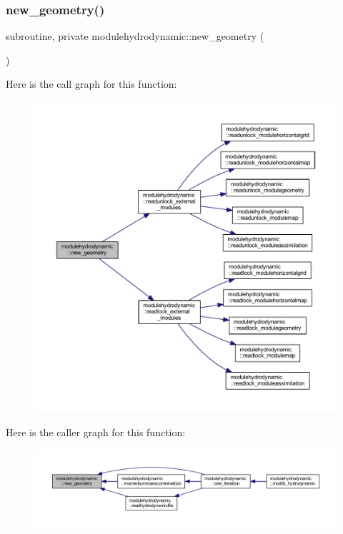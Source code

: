 \subsubsection{\texorpdfstring{new\+\_\+geometry()}{new\_geometry()}}
{\footnotesize\ttfamily subroutine, private modulehydrodynamic\+::new\+\_\+geometry (\begin{DoxyParamCaption}{ }\end{DoxyParamCaption})\hspace{0.3cm}{\ttfamily [private]}}

Here is the call graph for this function\+:\nopagebreak
\begin{figure}[H]
\begin{center}
\leavevmode
\includegraphics[width=350pt]{namespacemodulehydrodynamic_a348f4fbd3311ec9fc2bcc611faaa34be_cgraph}
\end{center}
\end{figure}
Here is the caller graph for this function\+:\nopagebreak
\begin{figure}[H]
\begin{center}
\leavevmode
\includegraphics[width=350pt]{namespacemodulehydrodynamic_a348f4fbd3311ec9fc2bcc611faaa34be_icgraph}
\end{center}
\end{figure}
\mbox{\label{namespacemodulehydrodynamic_a9865dafdd7098ab67142ed4fe05d5548}} 

